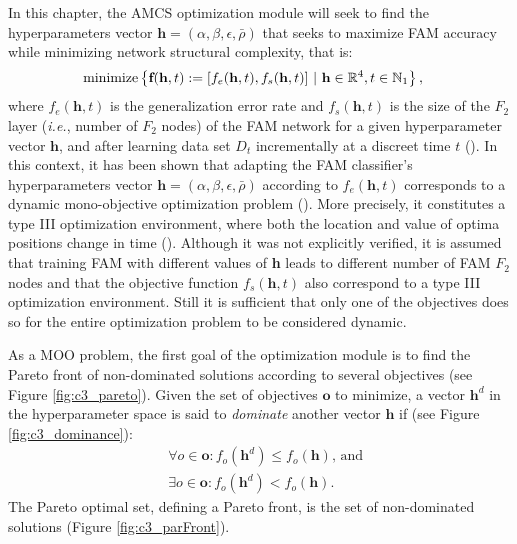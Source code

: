 In this chapter, the AMCS optimization module will seek to find the hyperparameters vector $\textbf{h}=\left(\alpha, \beta, \epsilon, \bar{\rho}\right)$ that seeks to maximize FAM accuracy while minimizing network structural complexity, that is: 
\begin{equation}  \label{eq:c3_dmoop}
	\begin{split}
		 \textnormal{minimize} &  \left\{ \textbf{f}(\textbf{h},t):= [f_e(\textbf{h},t), f_s(\textbf{h},t)]\ |\ 		
												\textbf{h}\in\mathbb{R}^4, t\in\mathbb{N}_1 \right\},
	\end{split}
\end{equation}
where $f_e(\mathbf{h},t)$ is the generalization error rate and $f_s(\mathbf{h},t)$ is the size of the $F_2$ layer (\emph{i.e.}, number of $F_2$ nodes) of the FAM network for a given hyperparameter vector $\textbf{h}$, and after learning data set $D_t$ incrementally at a discreet time $t$ (\cite{connolly10}).
In this context, it has been shown that adapting the FAM classifier's hyperparameters vector $\textbf{h}=\left(\alpha, \beta, \epsilon, \bar{\rho}\right)$ according to $f_e(\mathbf{h},t)$ corresponds to a dynamic mono-objective optimization problem (\cite{connolly10}).
More precisely, it constitutes a type III optimization environment, where both the location and value of optima positions change in time (\cite{engelbrecht05}).
Although it was not explicitly verified, it is assumed that training FAM with different values of \textbf{h} leads to different number of FAM $F_2$ nodes and that the objective function $f_s(\textbf{h},t)$ also correspond to a type III optimization environment.
Still it is sufficient that only one of the objectives does so for the entire optimization problem to be considered dynamic.

As a MOO problem, the first goal of the optimization module is to find the Pareto front of non-dominated solutions according to several objectives (see Figure \ref{fig:c3_pareto}).
Given the set of objectives $\mathbf{o}$ to minimize, a vector $\textbf{h}^d$ in the hyperparameter space is said to \emph{dominate} another vector $\textbf{h}$ if (see Figure \ref{fig:c3_dominance}):
\begin{equation}  \label{eq:c3_dom}
	\begin{split}
		&\forall o \in \mathbf{o}: f_o(\textbf{h}^d) \leq f_o(\textbf{h})
			\text{, and}\\
		&\exists o \in \mathbf{o}: f_o(\textbf{h}^d) < f_o(\textbf{h}).
	\end{split}
\end{equation}
The Pareto optimal set, defining a Pareto front, is the set of non-dominated solutions (Figure \ref{fig:c3_parFront}).

